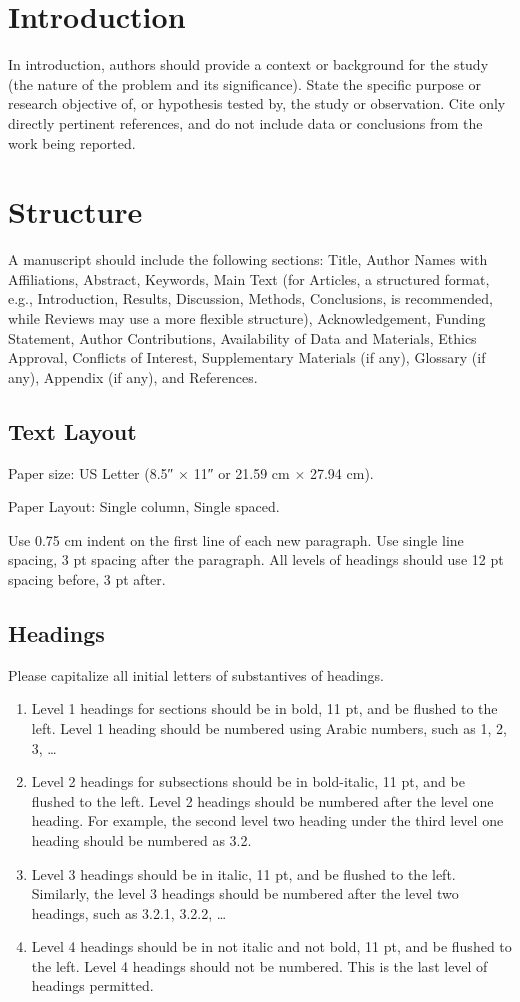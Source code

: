 \documentclass[journal,article,submit,moreauthors,pdftex]{Definitions/tsp}
\begin{document}
\section{Introduction} \label{sect:s1}
In introduction, authors should provide a context or background for the study (the nature of the problem and its significance). State the specific purpose or research objective of, or hypothesis tested by, the study or observation. Cite only directly pertinent references, and do not include data or conclusions from the work being reported.
 

\section{Structure} \label{sect:s2}
A manuscript should include the following sections: Title, Author Names with Affiliations, Abstract, Keywords, Main Text (for Articles, a structured format, e.g., Introduction, Results, Discussion, Methods, Conclusions, is recommended, while Reviews may use a more flexible structure), Acknowledgement, Funding Statement, Author Contributions, Availability of Data and Materials, Ethics Approval, Conflicts of Interest, Supplementary Materials (if any), Glossary (if any), Appendix (if any), and References.

\subsection{Text Layout} \label{sect:s2dot1}
Paper size: US Letter (8.5″ $\times$ 11″ or 21.59 cm $\times$ 27.94 cm).

Paper Layout: Single column, Single spaced.

Use 0.75 cm indent on the first line of each new paragraph. Use single line spacing, 3 pt spacing after the paragraph. All levels of headings should use 12 pt spacing before, 3 pt after.

\subsection{Headings} \label{sect:s2dot2}
Please capitalize all initial letters of substantives of headings.
\begin{enumerate}[label=$\bullet$]
\item Level 1 headings for sections should be in bold, 11 pt, and be flushed to the left. Level 1 heading should be numbered using Arabic numbers, such as 1, 2, 3, \dots
\item Level 2 headings for subsections should be in bold-italic, 11 pt, and be flushed to the left. Level 2 headings should be numbered after the level one heading. For example, the second level two heading under the third level one heading should be numbered as 3.2.
\item Level 3 headings should be in italic, 11 pt, and be flushed to the left. Similarly, the level 3 headings should be numbered after the level two headings, such as 3.2.1, 3.2.2, \dots
\item Level 4 headings should be in not italic and not bold, 11 pt, and be flushed to the left. Level 4 headings should not be numbered. This is the last level of headings permitted.
\end{enumerate}
\end{document}
